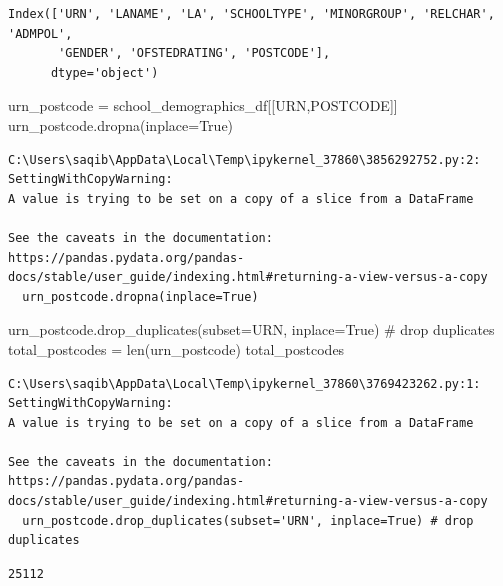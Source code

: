 \documentclass[
  letterpaper,
  DIV=11,
  numbers=noendperiod]{scrartcl}
\newenvironment{Shaded}{\begin{snugshade}}{\end{snugshade}}
\newcommand{\BuiltInTok}[1]{\textcolor[rgb]{0.00,0.23,0.31}{#1}}
\newcommand{\CommentTok}[1]{\textcolor[rgb]{0.37,0.37,0.37}{#1}}
\newcommand{\NormalTok}[1]{\textcolor[rgb]{0.00,0.23,0.31}{#1}}
\newcommand{\OperatorTok}[1]{\textcolor[rgb]{0.37,0.37,0.37}{#1}}
\newcommand{\StringTok}[1]{\textcolor[rgb]{0.13,0.47,0.30}{#1}}
\newcommand{\VariableTok}[1]{\textcolor[rgb]{0.07,0.07,0.07}{#1}}
\begin{document}
\begin{verbatim}
Index(['URN', 'LANAME', 'LA', 'SCHOOLTYPE', 'MINORGROUP', 'RELCHAR', 'ADMPOL',
       'GENDER', 'OFSTEDRATING', 'POSTCODE'],
      dtype='object')
\end{verbatim}

\begin{Shaded}
\begin{Highlighting}[]
\NormalTok{urn\_postcode }\OperatorTok{=}\NormalTok{ school\_demographics\_df[[}\StringTok{\textquotesingle{}URN\textquotesingle{}}\NormalTok{,}\StringTok{\textquotesingle{}POSTCODE\textquotesingle{}}\NormalTok{]]}
\NormalTok{urn\_postcode.dropna(inplace}\OperatorTok{=}\VariableTok{True}\NormalTok{)}
\end{Highlighting}
\end{Shaded}

\begin{verbatim}
C:\Users\saqib\AppData\Local\Temp\ipykernel_37860\3856292752.py:2: SettingWithCopyWarning: 
A value is trying to be set on a copy of a slice from a DataFrame

See the caveats in the documentation: https://pandas.pydata.org/pandas-docs/stable/user_guide/indexing.html#returning-a-view-versus-a-copy
  urn_postcode.dropna(inplace=True)
\end{verbatim}

\begin{Shaded}
\begin{Highlighting}[]
\NormalTok{urn\_postcode.drop\_duplicates(subset}\OperatorTok{=}\StringTok{\textquotesingle{}URN\textquotesingle{}}\NormalTok{, inplace}\OperatorTok{=}\VariableTok{True}\NormalTok{) }\CommentTok{\# drop duplicates}
\NormalTok{total\_postcodes }\OperatorTok{=} \BuiltInTok{len}\NormalTok{(urn\_postcode)}
\NormalTok{total\_postcodes}
\end{Highlighting}
\end{Shaded}

\begin{verbatim}
C:\Users\saqib\AppData\Local\Temp\ipykernel_37860\3769423262.py:1: SettingWithCopyWarning: 
A value is trying to be set on a copy of a slice from a DataFrame

See the caveats in the documentation: https://pandas.pydata.org/pandas-docs/stable/user_guide/indexing.html#returning-a-view-versus-a-copy
  urn_postcode.drop_duplicates(subset='URN', inplace=True) # drop duplicates
\end{verbatim}

\begin{verbatim}
25112
\end{verbatim}
\end{document}
